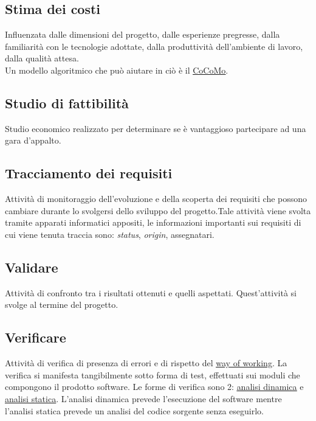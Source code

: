 	\subsection{Stima dei costi}
	\label{sec:stimacosti}
	Influenzata dalle dimensioni del progetto, dalle esperienze pregresse, dalla familiarità con le tecnologie adottate, dalla produttività dell'ambiente di lavoro, dalla qualità attesa. \\Un modello algoritmico che può aiutare in ciò è il \underline{\hyperref[sec:cocomo]{CoCoMo}}.

	\subsection{Studio di fattibilità}
	\label{sec:studiofattibilita}
	Studio economico realizzato per determinare se è vantaggioso partecipare ad una gara d'appalto.\newpage

	\subsection{Tracciamento dei requisiti}
	\label{sec:tracciamentorequisiti}
	Attività di monitoraggio dell'evoluzione e della scoperta dei requisiti che possono cambiare durante lo svolgersi dello sviluppo del progetto.Tale attività viene svolta tramite apparati informatici appositi, le informazioni importanti sui requisiti di cui viene tenuta traccia sono: \emph{status}, \emph{origin}, assegnatari.\newpage

	\subsection{Validare}
	\label{sec:validare}
	Attività di confronto tra i risultati ottenuti e quelli aspettati. Quest'attività si svolge al termine del progetto.
	
	\subsection{Verificare}
	\label{sec:verificare}
	Attività di verifica di presenza di errori e di rispetto del \underline{\hyperref[sec:wow]{way of working}}. La verifica si manifesta tangibilmente sotto forma di test, effettuati sui moduli che compongono il prodotto software. Le forme di verifica sono 2: \hyperref[sec:analisidinamica]{\underline{analisi dinamica}} e \hyperref[sec:analisistatica]{\underline{analisi statica}}. L'analisi dinamica prevede l'esecuzione del software mentre l'analisi statica prevede un analisi del codice sorgente senza eseguirlo. 
	
